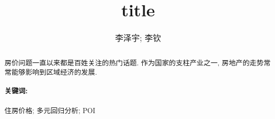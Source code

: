 \documentclass{iarticle}
\title{title}
\author{李泽宇; 李钦}
\date{}
\begin{document}
\maketitle

\begin{abstract}
  房价问题一直以来都是百姓关注的热门话题.
  作为国家的支柱产业之一, 房地产的走势常常能够影响到区域经济的发展.

  \paragraph{关键词:}
  住房价格; 多元回归分析; POI
\end{abstract}

\tableofcontents
\listoffigures
\listoftables



% 


% 
% 
\end{document}

